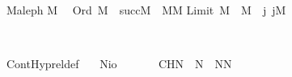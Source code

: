 \begin{isabelle}%
\isamarkupfalse%
\ M{\isacharunderscore}{\kern0pt}aleph\isanewline
{}%
\isanewline
\isanewline
{\isasymaleph}\isactrlesub \isactrlbsup M\isactrlesup \ {\isacharequal}{\kern0pt}\ {\isasymomega}\isasep\isanewline%
{\isasymlbrakk}Ord{\isacharparenleft}{\kern0pt}{\isasymalpha}{\isacharparenright}{\kern0pt}{\isacharsemicolon}{\kern0pt}\ M{\isacharparenleft}{\kern0pt}{\isasymalpha}{\isacharparenright}{\kern0pt}{\isasymrbrakk}\ {\isasymLongrightarrow}\ {\isasymaleph}\isactrlbsub succ{\isacharparenleft}{\kern0pt}{\isasymalpha}{\isacharparenright}{\kern0pt}\isactrlesub \isactrlbsup M\isactrlesup \ {\isacharequal}{\kern0pt}\ {\isacharparenleft}{\kern0pt}{\isasymaleph}\isactrlbsub {\isasymalpha}\isactrlesub \isactrlbsup M\isactrlesup \isactrlsup {\isacharplus}{\kern0pt}{\isacharparenright}{\kern0pt}\isactrlbsup M\isactrlesup \isasep\isanewline%
{\isasymlbrakk}Limit{\isacharparenleft}{\kern0pt}{\isasymalpha}{\isacharparenright}{\kern0pt}{\isacharsemicolon}{\kern0pt}\ M{\isacharparenleft}{\kern0pt}{\isasymalpha}{\isacharparenright}{\kern0pt}{\isasymrbrakk}\ {\isasymLongrightarrow}\ {\isasymaleph}\isactrlbsub {\isasymalpha}\isactrlesub \isactrlbsup M\isactrlesup \ {\isacharequal}{\kern0pt}\ {\isacharparenleft}{\kern0pt}{\isasymUnion}j{\isasymin}{\isasymalpha}{\isachardot}{\kern0pt}\ {\isasymaleph}\isactrlbsub j\isactrlesub \isactrlbsup M\isactrlesup {\isacharparenright}{\kern0pt}%
\end{isabelle}%
\isamarkupfalse%
\ %
\begin{isabelle}
\isamarkupfalse%
\ ContHyp{\isacharunderscore}{\kern0pt}rel{\isacharunderscore}{\kern0pt}def{\isacharprime}{\kern0pt}{\isacharcolon}{\kern0pt}\isanewline
\ \ \ N{\isacharcolon}{\kern0pt}{\isacharcolon}{\kern0pt}{\isachardoublequoteopen}i{\isasymRightarrow}o{\isachardoublequoteclose}\isanewline
\ \ \isanewline
\ \ \ \ {\isachardoublequoteopen}CH\isactrlbsup N\isactrlesup \ {\isasymequiv}\ {\isasymaleph}\isactrlesub \isactrlbsup N\isactrlesup \ {\isacharequal}{\kern0pt}\ {}\isactrlbsup {\isasymup}{\isasymaleph}\isactrlesub \isactrlbsup N\isactrlesup {\isacharcomma}{\kern0pt}N\isactrlesup {\isachardoublequoteclose}
\end{isabelle}

